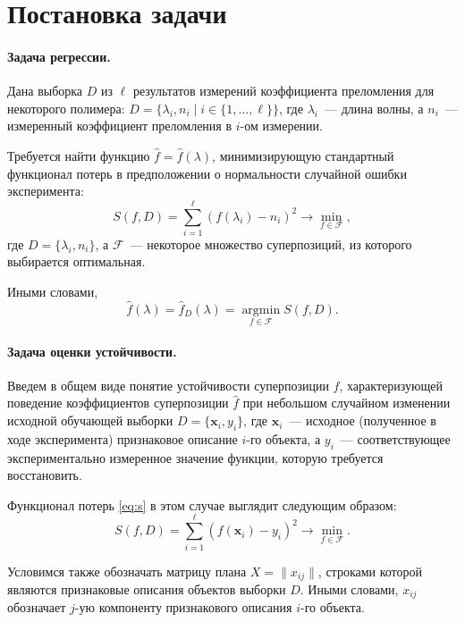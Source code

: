 \documentclass[11pt,a4paper]{article}
\theoremstyle{definition}
\begin{document}
\section{Постановка задачи}

\paragraph{Задача регрессии.}
Дана выборка $D$ из $\ell$ результатов измерений коэффициента
преломления для некоторого полимера:
$D = \{ \lambda_i, n_i \mid i \in \{ 1, \dots, \ell \} \}$, где $\lambda_i$~--- длина волны,
а $n_i$~--- измеренный коэффициент преломления в $i$-ом измерении.

Требуется найти функцию $\hat{f} = \hat{f}(\lambda)$, минимизирующую стандартный
функционал потерь в предположении о нормальности случайной ошибки эксперимента:
\begin{equation}
  S(f, D) = \sum_{i = 1}^\ell (f(\lambda_i) - n_i)^2 \rightarrow \min_{f \in \mathcal{F}},
  \label{eq:s}
\end{equation}
где $D = \{ \lambda_i, n_i\}$, а $\mathcal{F}$~---
некоторое множество суперпозиций, из которого выбирается оптимальная.

Иными словами,
\begin{equation}
  \hat{f}(\lambda) = \hat{f}_D(\lambda) = \mathop{\arg \min}\limits_{f \in \mathcal{F}} S(f, D).
  \label{eq:fhat}
\end{equation}

\paragraph{Задача оценки устойчивости.}
Введем в общем виде понятие устойчивости суперпозиции $f$, характеризующей
поведение коэффициентов суперпозиции $\hat{f}$ при небольшом случайном
изменении исходной обучающей выборки
$D = \{ \mathbf{x}_i, y_i \}$,
где $\mathbf{x}_i$~--- исходное (полученное в ходе эксперимента)
признаковое описание $i$-го объекта, а $y_i$~--- соответствующее экспериментально
измеренное значение функции, которую требуется восстановить.

Функционал потерь \eqref{eq:s} в этом случае выглядит следующим образом: 
\begin{equation}
  S(f, D) = \sum_{i = 1}^\ell (f(\mathbf{x}_i) - y_i)^2 \rightarrow \min_{f \in \mathcal{F}}.
  \label{eq:s_common}
\end{equation}

Условимся также обозначать матрицу плана $X = \| x_{ij} \|$, строками которой
являются признаковые описания объектов выборки $D$. Иными словами, $x_{ij}$
обозначает $j$-ую компоненту признакового описания $i$-го объекта.
\end{document}

